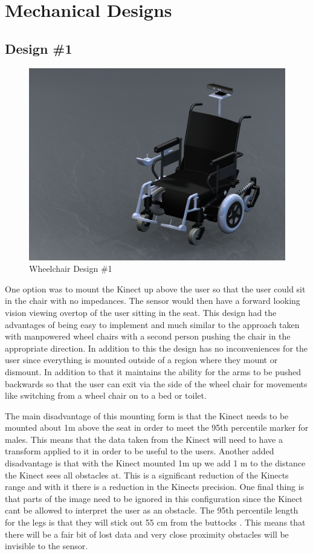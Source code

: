 \documentclass[oneside,final,a4paper]{report}
\begin{document}
\section{Mechanical Designs}
\subsection{Design \#1}
\begin{figure}[hbt]
 \centering
 \includegraphics[scale=0.15]{WheelChair_1}
 \caption{Wheelchair Design \#1}
\end{figure}

One option was to mount the Kinect up above the user so that the user could sit in the chair with no impedances. The sensor would then have a forward looking vision viewing overtop of the user sitting in the seat. This design had the advantages of being easy to implement and much similar to the approach taken with manpowered wheel chairs with a second person pushing the chair in the appropriate direction. In addition to this the design has no inconveniences for the user since everything is mounted outside of a region where they mount or dismount. In addition to that it maintains the ability for the arms to be pushed backwards so that the user can exit via the side of the wheel chair for movements like switching from a wheel chair on to a bed or toilet.

The main disadvantage of this mounting form is that the Kinect needs to be mounted about 1m above the seat in order to meet the 95th percentile marker for males. This means that the data taken from the Kinect will need to have a transform applied to it in order to be useful to the users. Another added disadvantage is that with the Kinect mounted 1m up we add 1 m to the distance the Kinect sees all obstacles at. This is a significant reduction of the Kinects range and with it there is a reduction in the Kinects precision. One final thing is that parts of the image need to be ignored in this configuration since the Kinect cant be allowed to interpret the user as an obstacle. The 95th percentile length for the legs is that they will stick out 55 cm from the buttocks \cite{NASA}. This means that there will be a fair bit of lost data and very close proximity obstacles will be invisible to the sensor.
\end{document}

